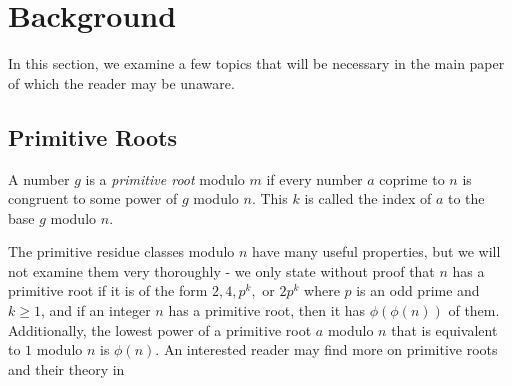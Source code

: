 \documentclass{article}
\theoremstyle{plain}
\begin{document}
\newpage




\section {Background}


In this section, we examine a few topics that will be necessary in the main paper of which the reader may be unaware. 


\subsection*{Primitive Roots}
\begin{definition}
A number $g$ is a \textit{primitive root} modulo $m$ if every number $a$ coprime to $n$ is congruent to some power of $g$ modulo $n$. This $k$ is called the index of $a$ to the base $g$ modulo $n$.
\end{definition}
\par The primitive residue classes modulo $n$ have many useful properties, but we will not examine them very thoroughly - we only state without proof that $n$ has a primitive root if it is of the form $2, 4, p^k, \text{ or } 2p^k$ where $p$ is an odd prime and $k \geq 1$, and if an integer $n$ has a primitive root, then it has $\phi(\phi(n))$ of them. Additionally, the lowest power of a primitive root $a$ modulo $n$ that is equivalent to $1$ modulo $n$ is $\phi(n)$. An interested reader may find more on primitive roots and their theory in \citep[Appendix 2]{riesel}
\end{document}
